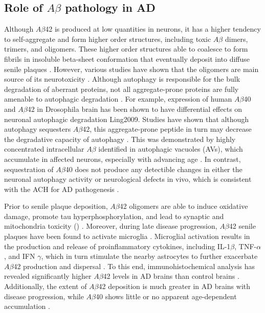 \subsection{Role of $A\beta$ pathology in AD}
Although $A\beta$42 is produced at low quantities in neurons, it has a higher tendency to self-aggregate and form higher order structures, including toxic $A\beta$ dimers, trimers, and oligomers. These higher order structures able to coalesce to form fibrils in insoluble beta-sheet conformation that eventually deposit into diffuse senile plaques \citep{Burdick1992,Gravina1995}. However, various studies have shown that the oligomers are main source of its neurotoxicity \citep{Shankar2008,Shankar2009}. Although autophagy is responsible for the bulk degradation of aberrant proteins, not all aggregate-prone proteins are fully amenable to autophagic degradation \citep{Wong2008}. For example, expression of human $A\beta$40 and $A\beta$42 in Drosophila brain has been shown to have differential effects on neuronal autophagic degradation {Ling2009}. Studies have shown that although autophagy sequesters $A\beta$42, this aggregate-prone peptide in turn may decrease the degradative capacity of autophagy \citep{Ling2014,Ling2011}. This was demonstrated by highly concentrated intracellular $A\beta$ identified in autophagic vacuoles (AVs), which accumulate in affected neurons, especially with advancing age \citep{Ling2011}. In contrast, sequestration of $A\beta$40 does not produce any detectible changes in either the neuronal autophagy activity or neurological defects in vivo, which is consistent with the ACH for AD pathogenesis \citep{Hardy1992}.

Prior to senile plaque deposition, $A\beta$42 oligomers are able to induce oxidative damage, promote tau hyperphosphorylation, and lead to synaptic and mitochondria toxicity () \citep{Kaminsky2015,Lustbader2004}. Moreover, during late disease progression, $A\beta$42 senile plaques have been found to activate microglia \citep{Rosenmann2013}. Microglial activation results in the production and release of proinflammatory cytokines, including IL-1$\beta$, TNF-$\alpha$, and IFN $\gamma$, which in turn stimulate the nearby astrocytes to further exacerbate $A\beta$42 production and dispersal \citep{DalPra2015}. To this end, immunohistochemical analysis has revealed significantly higher $A\beta$42 levels in AD brains than control brains \citep{Funato1998}. Additionally, the extent of $A\beta$42 deposition is much greater in AD brains with disease progression, while $A\beta$40 shows little or no apparent age-dependent accumulation \citep{Funato1998}.

